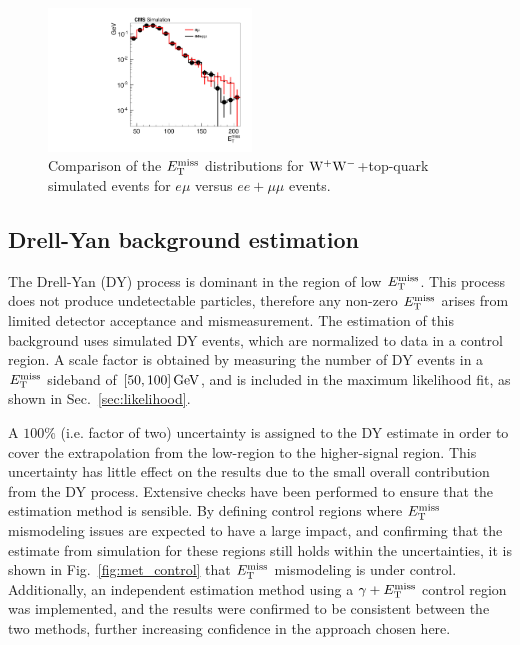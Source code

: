 \begin{figure}[hb]
\centering
\includegraphics[width=0.48\textwidth]{figures/met_tt_ww.pdf}
\caption{Comparison of the $E_\mathrm{T}^{\mathrm{miss}}$ distributions for $\mathrm{W}^+\mathrm{W}^-$+top-quark simulated 
events for $e\mu$ versus $ee+\mu\mu$ events.} 
\label{fig:met_tt_ww}
\end{figure}

\newpage
\subsection{Drell-Yan background estimation}
The Drell-Yan (DY) process is dominant in the region of low $E_{\mathrm{T}}^{\text{miss}}$.
This process does not produce undetectable particles, therefore any non-zero $E_{\mathrm{T}}^{\text{miss}}$ arises from
limited detector acceptance and mismeasurement.
The estimation of this background uses simulated DY events, which are normalized to data in a control region.
A scale factor is obtained by measuring the number of DY events in a $E_\mathrm{T}^{\mathrm{miss}}$ sideband of $[50, 100]\,\text{Ge\hspace{-.08em}V}$,
and is included in the maximum likelihood fit, as shown in Sec.~\ref{sec:likelihood}.

A $100\%$ (i.e. factor of two) uncertainty is assigned to the DY estimate in order to cover the extrapolation from the low-\met region to the higher-\met signal region.
This uncertainty has little effect on the results due to the small overall contribution from the DY process.
Extensive checks have been performed to ensure that the estimation method is sensible.
By defining control regions where $E_\mathrm{T}^{\mathrm{miss}}$ mismodeling issues are expected to have a large impact, and confirming that the 
estimate from simulation for these regions still holds within the uncertainties, it is shown in Fig.~\ref{fig:met_control} that $E_\mathrm{T}^{\mathrm{miss}}$ mismodeling is under control.
Additionally, an independent estimation method using a $\gamma+E_\mathrm{T}^{\mathrm{miss}}$ control region was implemented, and the results were 
confirmed to be consistent between the two methods, further increasing confidence in the approach chosen here.

